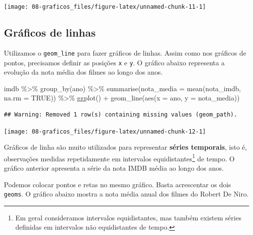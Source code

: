 \documentclass[
]{book}
\newenvironment{Shaded}{\begin{snugshade}}{\end{snugshade}}
\newcommand{\AttributeTok}[1]{\textcolor[rgb]{0.77,0.63,0.00}{#1}}
\newcommand{\ConstantTok}[1]{\textcolor[rgb]{0.00,0.00,0.00}{#1}}
\newcommand{\FunctionTok}[1]{\textcolor[rgb]{0.00,0.00,0.00}{#1}}
\newcommand{\NormalTok}[1]{#1}
\newcommand{\SpecialCharTok}[1]{\textcolor[rgb]{0.00,0.00,0.00}{#1}}
\begin{document}
\begin{center}\texttt{[image: 08-graficos\_files/figure-latex/unnamed-chunk-11-1]} \end{center}

\hypertarget{gruxe1ficos-de-linhas}{%
\subsection{Gráficos de linhas}\label{gruxe1ficos-de-linhas}}

Utilizamos o \texttt{geom\_line} para fazer gráficos de linhas. Assim como nos gráficos de pontos, precisamos definir as posições \texttt{x} e \texttt{y}. O gráfico abaixo representa a evolução da nota média dos filmes ao longo dos anos.

\begin{Shaded}
\begin{Highlighting}[]
\NormalTok{imdb }\SpecialCharTok{\%\textgreater{}\%} 
  \FunctionTok{group\_by}\NormalTok{(ano) }\SpecialCharTok{\%\textgreater{}\%} 
  \FunctionTok{summarise}\NormalTok{(}\AttributeTok{nota\_media =} \FunctionTok{mean}\NormalTok{(nota\_imdb, }\AttributeTok{na.rm =} \ConstantTok{TRUE}\NormalTok{)) }\SpecialCharTok{\%\textgreater{}\%} 
  \FunctionTok{ggplot}\NormalTok{() }\SpecialCharTok{+}
  \FunctionTok{geom\_line}\NormalTok{(}\FunctionTok{aes}\NormalTok{(}\AttributeTok{x =}\NormalTok{ ano, }\AttributeTok{y =}\NormalTok{ nota\_media))}
\end{Highlighting}
\end{Shaded}

\begin{verbatim}
## Warning: Removed 1 row(s) containing missing values (geom_path).
\end{verbatim}

\begin{center}\texttt{[image: 08-graficos\_files/figure-latex/unnamed-chunk-12-1]} \end{center}

Gráficos de linha são muito utilizados para representar \textbf{séries temporais}, isto é, observações medidas repetidamente em intervalos equidistantes\footnote{Em geral consideramos intervalos equidistantes, mas também existem séries definidas em intervalos não equidistantes de tempo.} de tempo. O gráfico anterior apresenta a série da nota IMDB média ao longo dos anos.

Podemos colocar pontos e retas no mesmo gráfico. Basta acrescentar os dois \texttt{geoms}. O gráfico abaixo mostra a nota média anual dos filmes do Robert De Niro.
\end{document}
